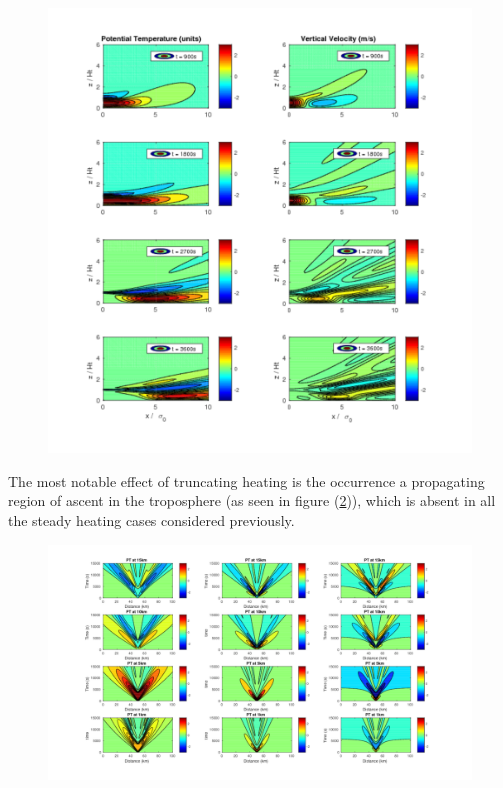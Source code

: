 \documentclass[a4paper,10pt]{article}
\begin{document}
\begin{figure}[h!]
  \caption{}
  \centering
    \includegraphics[width=1\textwidth]{Transient_vertical_cross.pdf}
  \label{vertical_cross_transient}
\end{figure}


The most notable effect of truncating heating is the occurrence a propagating region of ascent in
the troposphere (as seen in figure (\ref{Hovmoller_transient_diffs})), which is absent in all
the steady heating cases considered previously. 
\begin{figure}[h!]
  \caption{}
  \centering
    \includegraphics[width=1\textwidth]{hovmoller_transient_diffs.pdf}
  \label{Hovmoller_transient_diffs}
\end{figure}
\end{document}
